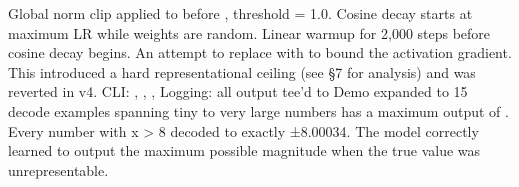 {} Global norm clip applied to  before , threshold = 1.0.\markdownRendererInterblockSeparator
{}
\markdownRendererSectionEnd \markdownRendererSectionBegin
{}\markdownRendererInterblockSeparator
{} Cosine decay starts at maximum LR while weights are random.\markdownRendererParagraphSeparator
{} Linear warmup for 2,000 steps before cosine decay begins.\markdownRendererInterblockSeparator
{}
\markdownRendererSectionEnd \markdownRendererSectionBegin
{}\markdownRendererInterblockSeparator
{}An attempt to replace  with  to bound the activation gradient. This introduced a hard representational ceiling (see §7 for analysis) and was reverted in v4.\markdownRendererInterblockSeparator
{}
\markdownRendererSectionEnd \markdownRendererSectionBegin
{}\markdownRendererInterblockSeparator
{}\markdownRendererUlBeginTight
\markdownRendererUlItem CLI: , , , \markdownRendererUlItemEnd 
\markdownRendererUlItem Logging: all output tee'd to \markdownRendererUlItemEnd 
\markdownRendererUlItem Demo expanded to 15 decode examples spanning tiny to very large numbers\markdownRendererUlItemEnd 
\markdownRendererUlEndTight \markdownRendererInterblockSeparator
{}\markdownRendererThematicBreak{}\markdownRendererInterblockSeparator
{}
\markdownRendererSectionEnd 
\markdownRendererSectionEnd \markdownRendererSectionBegin
{}\markdownRendererInterblockSeparator
{}\markdownRendererSectionBegin
{}\markdownRendererInterblockSeparator
{} has a maximum output of . Every number with \markdownRendererPipe{}x\markdownRendererPipe{} > 8 decoded to exactly ±8.00034. The model correctly learned to output the maximum possible magnitude when the true value was unrepresentable.\markdownRendererInterblockSeparator
